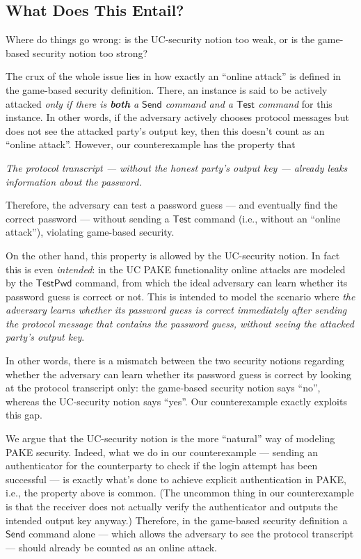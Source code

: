 \documentclass{article}
\newcommand{\TestPwd}{\mathsf{TestPwd}}
\newcommand{\Send}{\mathsf{Send}}
\newcommand{\Test}{\mathsf{Test}}
\begin{document}
\subsection{What Does This Entail?}
Where do things go wrong: is the UC-security notion too weak, or is the game-based security notion too strong?

The crux of the whole issue lies in how exactly an ``online attack'' is defined in the game-based security definition. There, an instance is said to be actively attacked \emph{only if there is \textbf{both} a $\Send$ command and a $\Test$ command} for this instance. In other words, if the adversary actively chooses protocol messages but does not see the attacked party's output key, then this doesn't count as an ``online attack''. However, our counterexample has the property that
\begin{displayquote}
\emph{The protocol transcript --- without the honest party's output key --- already leaks information about the password.}
\end{displayquote}
Therefore, the adversary can test a password guess --- and eventually find the correct password --- without sending a $\Test$ command (i.e., without an ``online attack''), violating game-based security.

On the other hand, this property is allowed by the UC-security notion. In fact this is even \emph{intended}: in the UC PAKE functionality online attacks are modeled by the $\TestPwd$ command, from which the ideal adversary can learn whether its password guess is correct or not. This is intended to model the scenario where \emph{the adversary learns whether its password guess is correct immediately after sending the protocol message that contains the password guess, without seeing the attacked party's output key}.

In other words, there is a mismatch between the two security notions regarding whether the adversary can learn whether its password guess is correct by looking at the protocol transcript only: the game-based security notion says ``no'', whereas the UC-security notion says ``yes''. Our counterexample exactly exploits this gap.

We argue that the UC-security notion is the more ``natural'' way of modeling PAKE security. Indeed, what we do in our counterexample --- sending an authenticator for the counterparty to check if the login attempt has been successful --- is exactly what's done to achieve explicit authentication in PAKE, i.e., the property above is common. (The uncommon thing in our counterexample is that the receiver does not actually verify the authenticator and outputs the intended output key anyway.) Therefore, in the game-based security definition a $\Send$ command alone --- which allows the adversary to see the protocol transcript --- should already be counted as an online attack.
\end{document}
